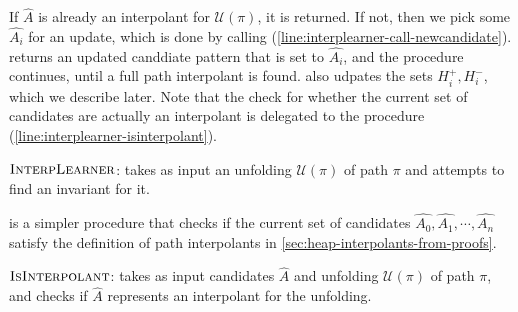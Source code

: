 If $\hat{A}$ is already an interpolant for $\mathcal{U}(\pi)$, it is returned. If not,
then we pick some $\hat{A_i}$ for an update, which is done by calling \newcandidate
(\autoref{line:interplearner-call-newcandidate}). \newcandidate returns an updated
canddiate pattern that is set to $\hat{A_i}$, and the procedure continues, until a full
path interpolant is found. \newcandidate also udpates the sets $H_i^{+}, H_i^{-}$, which
we describe later. Note that the check for whether the current set of candidates are
actually an interpolant is delegated to the \isinterpolant procedure
(\autoref{line:interplearner-isinterpolant}).

\begin{algorithm}[ht]


  \caption{$\textsc{InterpLearner}$: takes as input an unfolding $\mathcal{U}(\pi)$ of path $\pi$ and attempts to find an invariant for it.}
  \label{alg:interplearner}
\end{algorithm}

\isinterpolant is a simpler procedure that checks if the current set of candidates $\hat{A_0}, \hat{A_1}, \cdots, \hat{A_n}$ satisfy the definition of path interpolants in \autoref{sec:heap-interpolants-from-proofs}.

\begin{algorithm}[ht]


  \caption{$\textsc{IsInterpolant}$: takes as input candidates $\hat{A}$ and unfolding $\mathcal{U}(\pi)$ of path $\pi$, and checks if $\hat{A}$ represents an interpolant for the unfolding.}
  \label{alg:isinterpolant}
\end{algorithm}

